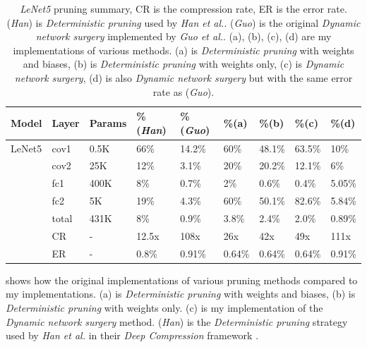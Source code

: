 \documentclass[a4paper,12pt]{report}
\begin{document}
\begin{table}[!h]
  \centering
  \begin{tabular}{lllllllll}
    \hline
    Model   &Layer     &Params    &\%(\textit{Han}\cite{Han15})   &\%(\textit{Guo}\cite{Guo}) &\%(a)  &\%(b)    &\%(c)  &\%(d)\\
    \hline
    LeNet5  &cov1     &0.5K       &66\%               &14.2\%           &60\%   &48.1\%   &63.5\%   &10\%\\
            &cov2     &25K        &12\%               &3.1\%            &20\%   &20.2\%   &12.1\%   &6\%\\
            &fc1      &400K       &8\%                &0.7\%            &2\%    &0.6\%    &0.4\%    &5.05\%\\
            &fc2      &5K         &19\%               &4.3\%            &60\%   &50.1\%   &82.6\%   &5.84\%\\
            &total    &431K       &8\%                &0.9\%            &3.8\%  &2.4\%    &2.0\%    &0.89\%\\
    \hline

            &CR       &-          &12.5x               &108x          &26x     &42x       &49x      &111x\\
            &ER       &-          &0.8\%               &0.91\%      &0.64\%  &0.64\%    &0.64\%     &0.91\%\\
    \hline
  \end{tabular}
  \caption{\textit{LeNet5} pruning summary, CR is the compression
  rate, ER is the error rate.
  (\textit{Han}) is \textit{Deterministic pruning} used by \textit{Han et al.}.
  (\textit{Guo}) is the original \textit{Dynamic network surgery} implemented by \textit{Guo et al.}.
  (a), (b), (c), (d) are my implementations of various methods.
  (a) is \textit{Deterministic pruning} with weights and biases, (b) is
  \textit{Deterministic pruning} with weights only, (c) is \textit{Dynamic network surgery}, (d) is
  also \textit{Dynamic network surgery} but with the same error rate as (\textit{Guo}).}
  \label{fig:prune_org_summary}
\end{table}
 shows how the original implementations of various
pruning methods compared to my implementations.
(a) is \textit{Deterministic pruning} with weights and biases, (b) is \textit{Deterministic
pruning} with weights only.
(c) is my implementation of the \textit{Dynamic network surgery} method.
(\textit{Han}) is the \textit{Deterministic pruning} strategy used by \textit{Han et al.}
in their \textit{Deep Compression} framework \cite{Han15}.
\end{document}
